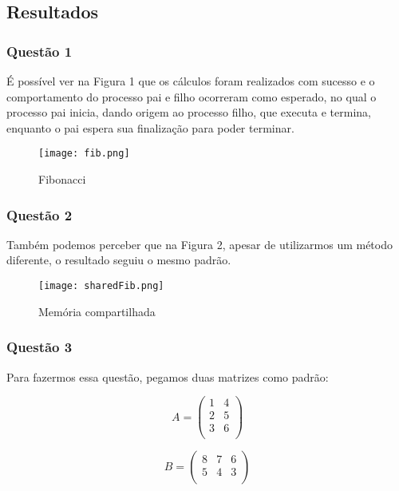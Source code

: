 \documentclass[
	article,			%
	11pt,				%
	oneside,			%
	a4paper,			%
	english,			%
	brazil,				%
	sumario=tradicional
	]{abntex2}
\begin{document}
\subsection*{Resultados}

\subsubsection*{Questão 1}

É possível ver na Figura 1 que os cálculos foram realizados com sucesso e o comportamento do processo pai e filho ocorreram como esperado, no qual o processo pai inicia, dando origem ao processo filho, que executa e termina, enquanto o pai espera sua finalização para poder terminar.

\begin{figure}[!htb]
\centering
\texttt{[image: fib.png]}
\caption{Fibonacci}
\end{figure}

\subsubsection*{Questão 2}

Também podemos perceber que na Figura 2, apesar de utilizarmos um método diferente, o resultado seguiu o mesmo padrão.

\begin{figure}[!htb]
\centering
\texttt{[image: sharedFib.png]}
\caption{Memória compartilhada}
\end{figure}

\subsubsection*{Questão 3}

Para fazermos essa questão, pegamos duas matrizes como padrão:

\begin{equation*}
A = 
\begin{pmatrix}
  1 & 4 \\
  2 & 5 \\
  3 & 6 \\
 \end{pmatrix}
 \end{equation*}

 \begin{equation*}
 B =
 \begin{pmatrix}
  8 & 7 & 6 \\
  5 & 4 & 3 \\
 \end{pmatrix}
 \end{equation*}
\end{document}
